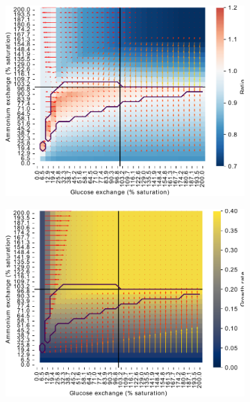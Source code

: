 \begin{figure}
  \centering
  \begin{subfigure}[t]{0.45\textwidth}
  \centering
    \includegraphics[width=\linewidth]{ec_grid_glc_amm_ratio}
    \caption{
    }
    \label{fig:model-grid-glc-ratio}
  \end{subfigure}%
  \begin{subfigure}[t]{0.45\textwidth}
  \centering
    \includegraphics[width=\linewidth]{ec_grid_glc_amm_gr}
    \caption{
    }
    \label{fig:model-grid-glc-growthrate}
  \end{subfigure}


\end{figure}
